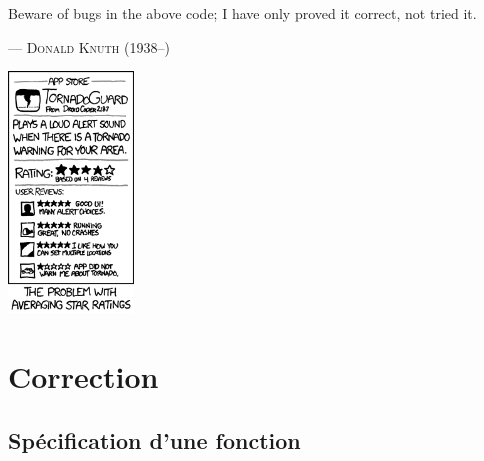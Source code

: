 \documentclass{magnolia}
\begin{document}

\setlength{}
\epigraph{\og Beware of bugs in the above code; I have only proved it correct, not tried it. \fg}{--- \textsc{Donald Knuth (1938--)}}
\hfill\includegraphics[width=0.25\textwidth]{../../Commun/Images/python-cours-tornadoguard}
\magtoc

\section{Correction}
\subsection{Spécification d'une fonction}
\end{document}
